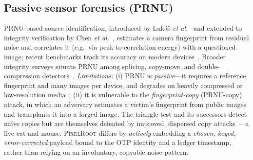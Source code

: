 \documentclass[journal]{IEEEtran}
\newcommand{\pr}{\textup{\textsc{PixelRoot}}}
\begin{document}
\subsection{Passive sensor forensics (PRNU)}
PRNU-based source identification, introduced by Luk\'a\v{s} \emph{et
al.}~\cite{lukas2006digital} and extended to integrity verification by Chen
\emph{et al.}~\cite{chen2008determining}, estimates a camera fingerprint from
residual noise and correlates it (e.g.\ via peak-to-correlation energy) with a
questioned image; recent benchmarks track its accuracy on modern
devices~\cite{prnubench2025}. Broader integrity surveys situate PRNU among
splicing, copy-move, and double-compression
detectors~\cite{korus2017digital,piva2013overview}. \emph{Limitations:} (i)
PRNU is \emph{passive}---it requires a reference fingerprint and many images per
device, and degrades on heavily compressed or low-resolution
media~\cite{prnubench2025}; (ii) it is vulnerable to the
\emph{fingerprint-copy} (PRNU-copy) attack, in which an adversary estimates a
victim's fingerprint from public images and transplants it into a forged image.
The triangle test and its successors detect na\"ive copies but are themselves
defeated by improved, dispersed
copy attacks~\cite{goljan2011defending}---a live cat-and-mouse. \pr{} differs by
\emph{actively} embedding a \emph{chosen, keyed, error-corrected} payload bound
to the OTP identity and a ledger timestamp, rather than relying on an
involuntary, copyable noise pattern.
\end{document}
